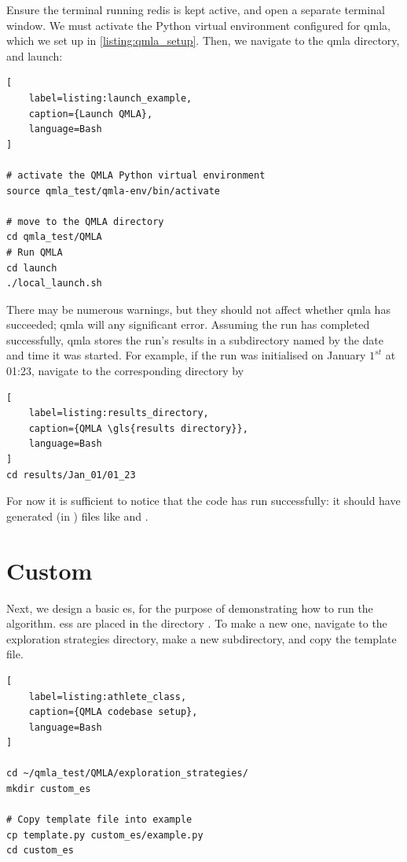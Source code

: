 Ensure the terminal running redis is kept active, and open a separate terminal window. 
We must activate the Python virtual environment configured for \gls{qmla}, 
which we set up in \cref{listing:qmla_setup}. 
Then, we navigate to the \gls{qmla} directory, and launch:
\begin{lstlisting}[
    label=listing:launch_example,
    caption={Launch QMLA},
    language=Bash
]

# activate the QMLA Python virtual environment 
source qmla_test/qmla-env/bin/activate

# move to the QMLA directory 
cd qmla_test/QMLA
# Run QMLA
cd launch   
./local_launch.sh

\end{lstlisting}

There may be numerous warnings, but they should not affect whether \gls{qmla} has succeeded; 
    \gls{qmla} will  any significant error. 
Assuming the \gls{run} has completed successfully, \gls{qmla} stores the run's results in a subdirectory
    named by the date and time it was started.  
For example, if the \gls{run} was initialised on January $1^{st}$ at 01:23, navigate to the corresponding directory by

\begin{lstlisting}[
    label=listing:results_directory,
    caption={QMLA \gls{results directory}},
    language=Bash
]
cd results/Jan_01/01_23
\end{lstlisting}

For now it is sufficient to notice that the code has \gls{run} successfully:
    it should have generated (in ) files like  and .

\section{Custom }

Next, we design a basic \gls{es}, for the purpose of demonstrating how to \gls{run} the algorithm.
\glspl{es} are placed in the directory . 
To make a new one, navigate to the exploration strategies directory, 
make a new subdirectory, and copy the template file. 

\begin{lstlisting}[
    label=listing:athlete_class,
    caption={QMLA codebase setup},
    language=Bash
]

cd ~/qmla_test/QMLA/exploration_strategies/
mkdir custom_es

# Copy template file into example
cp template.py custom_es/example.py
cd custom_es

\end{lstlisting}

